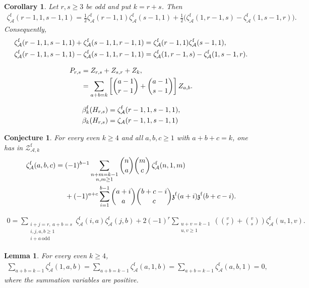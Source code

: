 \documentclass[10pt,a4paper]{amsart}
\newtheorem{cor}{Corollary}
\newtheorem{conj}{Conjecture}
\newtheorem{lem}{Lemma}
\newcommand{\ZAfw}[1]{{\mathcal Z_{\mathcal A,#1}^{\mathrm f}}}
\newcommand{\za}[1]{\zeta_{\mathcal A}(#1)}
\newcommand{\zaf}[1]{\zeta_{\mathcal A}^{\mathrm f}(#1)}
\newcommand{\zzf}[1]{\mathfrak z^{\mathrm f}(#1)}
\begin{document}
\begin{cor}
\label{cor:explicit-true-single-product}
Let $r,s\geq3$ be odd and put $k=r+s$. Then
\begin{align}\label{eq:four-one-product}
 \zaf{r-1,1,s-1,1}
 =\frac12\zaf{r-1,1}\zaf{s-1,1}
  +\frac12\bigl(\zaf{1,r-1,s}-\zaf{1,s-1,r}\bigr).
\end{align}
Consequently,
\begin{align}\label{eq:four-one-symmetry}
 \zaf{r-1,1,s-1,1}+\zaf{s-1,1,r-1,1}
 &=\zaf{r-1,1}\zaf{s-1,1},\\
 \zaf{r-1,1,s-1,1}-\zaf{s-1,1,r-1,1}
 &=\zaf{1,r-1,s}-\zaf{1,s-1,r}.\notag
\end{align}
\end{cor}

\begin{align}\label{eq:formal-double-shuffle}
 P_{r,s}
 &=Z_{r,s}+Z_{s,r}+Z_k,\\
 &=\sum_{a+b=k}\left[\binom{a-1}{r-1}+\binom{a-1}{s-1}\right]Z_{a,b}.\notag
\end{align}

\begin{align}\label{eq:direct-beta-rules}
 \beta_k^{\mathrm f}(H_{r,s})
 &=\zaf{r-1,1,s-1,1},\notag\\
 \beta_k(H_{r,s})
 &=\za{r-1,1,s-1,1}
\end{align}

\begin{conj}\label{conj:beta-identities}
For every even $k\geq4$ and all $a,b,c\geq1$ with $a+b+c=k$, one has
in $\ZAfw{k}$
\begin{align}\label{eq:formal-Hoffman-depth-three}
 \zaf{a,b,c}
={}&(-1)^{b-1}
 \sum_{\substack{n+m=k-1\\n,m\geq1}}
 \binom na\binom mc\,\zaf{n,1,m}\notag\\
&+(-1)^{a+c}\sum_{i=1}^{b-1}
 \binom{a+i}{a}\binom{b+c-i}{c}
 \zzf{a+i}\zzf{b+c-i}.
\end{align}
\end{conj}

\begin{align}\label{eq:formal-harmonic}
0=
 \sum_{\substack{i+j=r,\ a+b=s\\i,j,a,b\geq1\\i+a\ \mathrm{odd}}}
 \zaf{i,a}\zaf{j,b}
 +2(-1)^r\sum_{\substack{u+v=k-1\\u,v\geq1}}
 \left(\binom vr+\binom vs\right)\zaf{u,1,v}.
\end{align}

\begin{lem}\label{lem:restricted-sum}
For every even $k\geq4$,
\begin{align}\label{eq:restricted-sum}
 \sum_{a+b=k-1}\zaf{1,a,b}
 =\sum_{a+b=k-1}\zaf{a,1,b}
 =\sum_{a+b=k-1}\zaf{a,b,1}=0,
\end{align}
where the summation variables are positive.
\end{lem}
\end{document}
